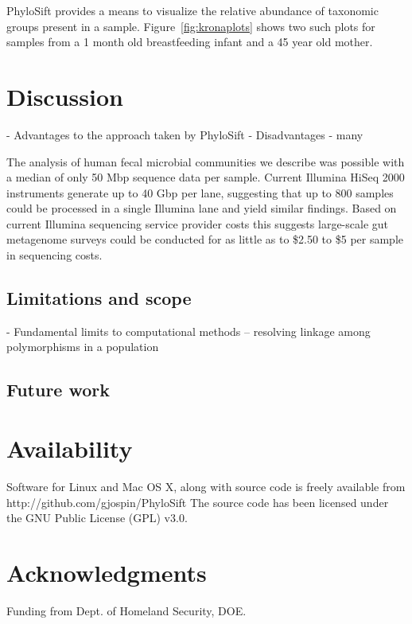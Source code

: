 \documentclass[10pt]{article}
\begin{document}
PhyloSift provides a means to visualize the relative abundance of taxonomic groups present in a sample.
Figure~\ref{fig:kronaplots} shows two such plots for samples from a 1 month old breastfeeding infant and a 45 year old mother.



\section*{Discussion}
  - Advantages to the approach taken by PhyloSift
  - Disadvantages
    - many

The analysis of human fecal microbial communities we describe was possible with a median of only 50 Mbp sequence data per sample.
Current Illumina HiSeq 2000 instruments generate up to 40 Gbp per lane, suggesting that up to 800 samples could be processed in a single Illumina lane and yield similar findings.
Based on current Illumina sequencing service provider costs this suggests large-scale gut metagenome surveys could be conducted for as little as to \$2.50 to \$5 per sample in sequencing costs.


\subsection*{Limitations and scope}
  - Fundamental limits to computational methods -- resolving linkage among polymorphisms in a population


\subsection*{Future work}


\section*{Availability}
Software for Linux and Mac OS X, along with source code is freely available from http://github.com/gjospin/PhyloSift
The source code has been licensed under the GNU Public License (GPL) v3.0.

\section*{Acknowledgments}
Funding from Dept. of Homeland Security, DOE.


\end{document}
